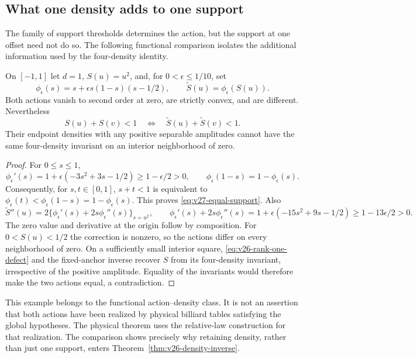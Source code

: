 \subsection{What one density adds to one support}
\label{sec:v27-density-support}

The family of support thresholds determines the action, but the support
at one offset need not do so.  The following functional comparison
isolates the additional information used by the four-density identity.

\begin{proposition}
\label{prop:v27-support-gauge}
On $[-1,1]$ let $d=1$, $S(u)=u^2$, and, for $0<\epsilon\le1/10$, set
\[
 \phi_\epsilon(s)=s+\epsilon s(1-s)(s-1/2),\qquad
 \widetilde S(u)=\phi_\epsilon(S(u)).
\]
Both actions vanish to second order at zero, are strictly convex, and
are different.  Nevertheless
\begin{equation}\label{eq:v27-equal-support}
 S(u)+S(v)<1\quad\Longleftrightarrow\quad
                    \widetilde S(u)+\widetilde S(v)<1.
\end{equation}
Their endpoint densities with any positive separable amplitudes cannot
have the same four-density invariant on an interior neighborhood of zero.
\end{proposition}

\begin{proof}
For $0\le s\le1$,
\[
 \phi_\epsilon'(s)=1+\epsilon(-3s^2+3s-1/2)\ge1-\epsilon/2>0,
 \qquad \phi_\epsilon(1-s)=1-\phi_\epsilon(s).
\]
Consequently, for $s,t\in[0,1]$, $s+t<1$ is equivalent to
$\phi_\epsilon(t)<\phi_\epsilon(1-s)=1-\phi_\epsilon(s)$.
This proves \eqref{eq:v27-equal-support}.  Also
\[
 \widetilde S''(u)
 =2\{\phi_\epsilon'(s)+2s\phi_\epsilon''(s)\}_{s=u^2},\qquad
 \phi_\epsilon'(s)+2s\phi_\epsilon''(s)
 =1+\epsilon(-15s^2+9s-1/2)\ge1-13\epsilon/2>0.
\]
The zero value and derivative at the origin follow by composition.
For $0<S(u)<1/2$ the correction is nonzero, so the actions differ on
every neighborhood of zero.  On a sufficiently small interior square,
\eqref{eq:v26-rank-one-defect} and the fixed-anchor inverse recover $S$
from its four-density invariant, irrespective of the positive amplitude.
Equality of the invariants would therefore make the two actions equal,
a contradiction.
\end{proof}

This example belongs to the functional action--density class.  It is not
an assertion that both actions have been realized by physical billiard
tables satisfying the global hypotheses.  The physical theorem uses the
relative-law construction for that realization.  The comparison shows
precisely why retaining density, rather than just one support, enters
Theorem~\ref{thm:v26-density-inverse}.
